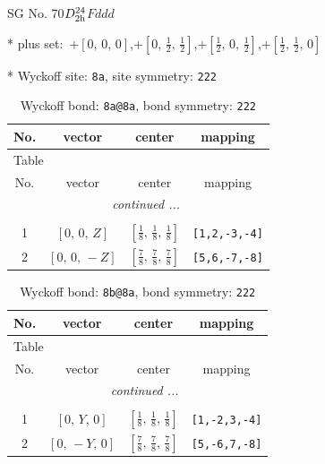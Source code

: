 \documentclass[fleqn,8pt]{jsarticle}
\begin{document}
\setcounter{MaxMatrixCols}{32}

\renewcommand{\tablename}{Table~}
\renewcommand{\figurename}{Figure~}
\begin{center}
\LARGE
SG No. 70\quad$D_{\rm 2h}^{24}$\quad$Fddd$\quad[ orthorhombic ]
\end{center}

* plus set:\,\,\,$+\left[ 0,\, 0,\, 0 \right]$,\quad $+\left[ 0,\, \frac{1}{2},\, \frac{1}{2} \right]$,\quad $+\left[ \frac{1}{2},\, 0,\, \frac{1}{2} \right]$,\quad $+\left[ \frac{1}{2},\, \frac{1}{2},\, 0 \right]$


* Wyckoff site: {\tt 8a}, site symmetry: {\tt 222}
\renewcommand{\arraystretch}{1.2}
\begin{longtable}{cccc}
\caption{Wyckoff bond: {\tt 8a@8a}, bond symmetry: {\tt 222}}
 \\
 \hline \hline
No. & vector & center & mapping \\ \hline \endfirsthead

\multicolumn{3}{l}{\tablename\ \thetable{}} \\
 \hline \hline
No. & vector & center & mapping \\ \hline \endhead

 \hline \hline
\multicolumn{3}{r}{\footnotesize\it continued ...} \\ \endfoot

 \hline \hline
\multicolumn{3}{r}{} \\ \endlastfoot

1 & $\left[ 0,\, 0,\, Z \right]$ & $\left[ \frac{1}{8},\, \frac{1}{8},\, \frac{1}{8} \right]$ & {\tt [1,2,-3,-4]} \\ \hline
2 & $\left[ 0,\, 0,\, - Z \right]$ & $\left[ \frac{7}{8},\, \frac{7}{8},\, \frac{7}{8} \right]$ & {\tt [5,6,-7,-8]} \\
\end{longtable}
\renewcommand{\arraystretch}{1.2}
\begin{longtable}{cccc}
\caption{Wyckoff bond: {\tt 8b@8a}, bond symmetry: {\tt 222}}
 \\
 \hline \hline
No. & vector & center & mapping \\ \hline \endfirsthead

\multicolumn{3}{l}{\tablename\ \thetable{}} \\
 \hline \hline
No. & vector & center & mapping \\ \hline \endhead

 \hline \hline
\multicolumn{3}{r}{\footnotesize\it continued ...} \\ \endfoot

 \hline \hline
\multicolumn{3}{r}{} \\ \endlastfoot

1 & $\left[ 0,\, Y,\, 0 \right]$ & $\left[ \frac{1}{8},\, \frac{1}{8},\, \frac{1}{8} \right]$ & {\tt [1,-2,3,-4]} \\ \hline
2 & $\left[ 0,\, - Y,\, 0 \right]$ & $\left[ \frac{7}{8},\, \frac{7}{8},\, \frac{7}{8} \right]$ & {\tt [5,-6,7,-8]} \\
\end{longtable}
\end{document}
